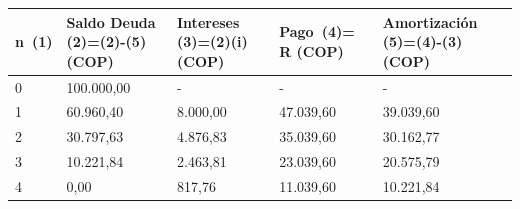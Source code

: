 	\begin{center}
	\begin{spacing}{1.1}
		\begin{tabular}{|p{1cm}|p{2cm}|p{2cm}|p{2cm}|p{3cm}|}
			\hline
			\rowcolor{white!50}
			\textbf{n\ (1)} & \textbf{Saldo Deuda (2)=(2)-(5) (COP)} & \textbf{Intereses  (3)=(2)(i) (COP)} & \textbf{Pago\ (4)= R (COP)  } & \textbf{Amortización  (5)=(4)-(3) (COP)} \\ \hline
			
			0               &   100{.}000,00                     & -                     & -               & -                         \\ \hline
			1               &   60{.}960,40                      &    8{.}000,00                    &  47{.}039,60             &   39{.}039,60                        \\ \hline
			2               &   30{.}797,63                      &    4{.}876,83                    &  35{.}039,60             &   30{.}162,77                        \\ \hline
			3               &   10{.}221,84                      &   2{.}463,81                     &   23.039,60             &   20{.}575,79                        \\ \hline
			4               &   0,00                           &   817,76                       &   11{.}039,60             &   10{.}221,84                        \\ \hline
		\end{tabular}
	\end{spacing}
\end{center}
